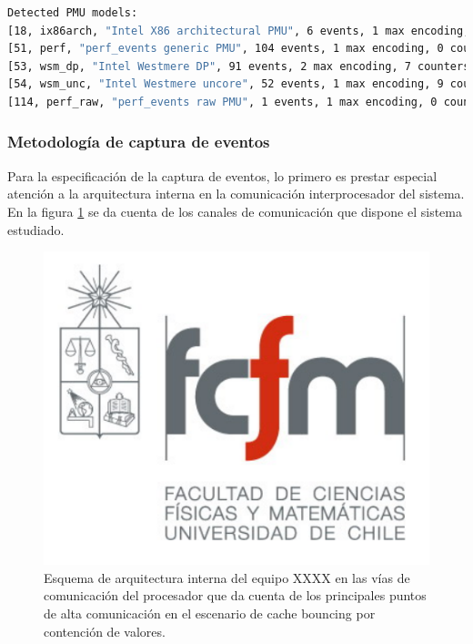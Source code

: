 \begin{lstlisting}[language=bash, breaklines=true, frame=single, caption={Sacado con la super herramienta}, captionpos=b]
Detected PMU models:
[18, ix86arch, "Intel X86 architectural PMU", 6 events, 1 max encoding, 7 counters, core PMU]
[51, perf, "perf_events generic PMU", 104 events, 1 max encoding, 0 counters, OS generic PMU]
[53, wsm_dp, "Intel Westmere DP", 91 events, 2 max encoding, 7 counters, core PMU]
[54, wsm_unc, "Intel Westmere uncore", 52 events, 1 max encoding, 9 counters, uncore PMU]
[114, perf_raw, "perf_events raw PMU", 1 events, 1 max encoding, 0 counters, OS generic PMU]
\end{lstlisting}

\subsubsection{Metodología de captura de eventos}
Para la especificación de la captura de eventos, lo primero es prestar especial atención a la arquitectura interna en la comunicación interprocesador del sistema. En la figura \ref{fig:hwcomm} se da cuenta de los canales de comunicación que dispone el sistema estudiado.

\begin{figure}[!h]
	\centering
	\includegraphics[scale=.3]{imagenes/fcfm}
	\caption{Esquema de arquitectura interna del equipo XXXX en las vías de comunicación del procesador que da cuenta de los principales puntos de alta comunicación en el escenario de cache bouncing por contención de valores.}
	\label{fig:hwcomm}
\end{figure}

